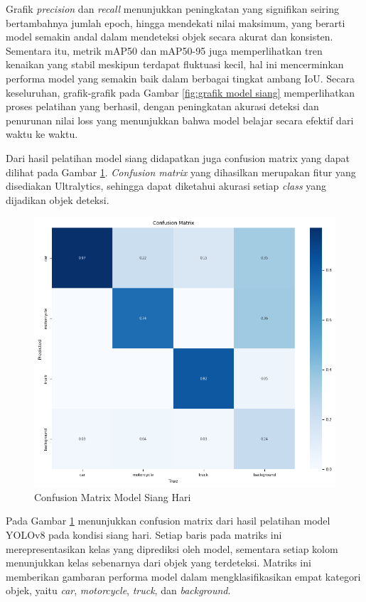 Grafik \emph{precision} dan \emph{recall} menunjukkan peningkatan yang signifikan seiring bertambahnya jumlah epoch, hingga mendekati nilai maksimum, yang berarti model semakin andal dalam mendeteksi objek secara akurat dan konsisten. Sementara itu, metrik mAP50 dan mAP50-95 juga memperlihatkan tren kenaikan yang stabil meskipun terdapat fluktuasi kecil, hal ini mencerminkan performa model yang semakin baik dalam berbagai tingkat ambang IoU. Secara keseluruhan, grafik-grafik pada Gambar \ref{fig:grafik model siang} memperlihatkan proses pelatihan yang berhasil, dengan peningkatan akurasi deteksi dan penurunan nilai loss yang menunjukkan bahwa model belajar secara efektif dari waktu ke waktu.

Dari hasil pelatihan model siang didapatkan juga confusion matrix yang dapat dilihat pada Gambar \ref{fig:confusion matrix siang}. \emph{Confusion matrix} yang dihasilkan merupakan fitur yang disediakan Ultralytics, sehingga dapat diketahui akurasi setiap \emph{class} yang dijadikan objek deteksi.

\begin{figure} [H] \centering
  \includegraphics[scale=0.8]{bab4/confusion_siang.png}
  \caption{Confusion Matrix Model Siang Hari}
  \label{fig:confusion matrix siang}
\end{figure}
Pada Gambar \ref{fig:confusion matrix siang} menunjukkan confusion matrix dari hasil pelatihan model YOLOv8 pada kondisi siang hari. Setiap baris pada matriks ini merepresentasikan kelas yang diprediksi oleh model, sementara setiap kolom menunjukkan kelas sebenarnya dari objek yang terdeteksi. Matriks ini memberikan gambaran performa model dalam mengklasifikasikan empat kategori objek, yaitu \emph{car}, \emph{motorcycle}, \emph{truck}, dan \emph{background}.

